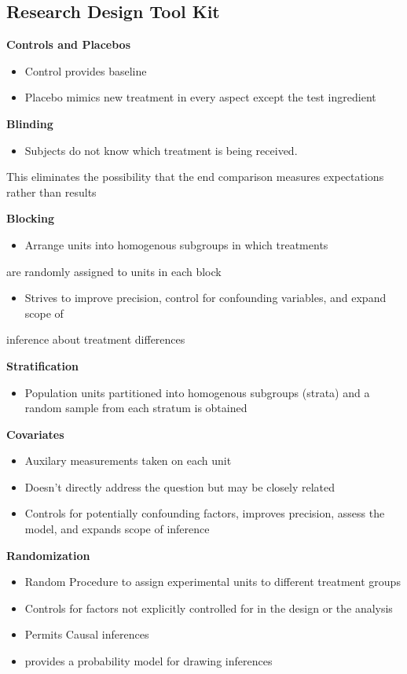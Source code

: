 \documentclass[11pt]{article}
\begin{document}
\subsection{Research Design Tool Kit}
\label{sec:org1912f44}
\textbf{Controls and Placebos}
\begin{itemize}
\item Control provides baseline
\item Placebo mimics new treatment in every aspect except the test ingredient
\end{itemize}

\textbf{Blinding}
\begin{itemize}
\item Subjects do not know which treatment is being received.
\end{itemize}
This eliminates the possibility that the end comparison measures
expectations rather than results

\textbf{Blocking}
\begin{itemize}
\item Arrange units into homogenous subgroups in which treatments
\end{itemize}
are randomly assigned to units in each block
\begin{itemize}
\item Strives to improve precision, control for confounding variables, and expand scope of
\end{itemize}
inference about treatment differences

\textbf{Stratification}
\begin{itemize}
\item Population units partitioned into homogenous subgroups (strata) and a random sample from each stratum is obtained
\end{itemize}

\textbf{Covariates}
\begin{itemize}
\item Auxilary measurements taken on each unit
\item Doesn't directly address the question but may be closely related
\item Controls for potentially confounding factors, improves precision, assess the
model, and expands scope of inference
\end{itemize}

\textbf{Randomization}
\begin{itemize}
\item Random Procedure to assign experimental units to different treatment groups
\item Controls for factors not explicitly controlled for in the design or the
analysis
\item Permits Causal inferences
\item provides a probability model for drawing inferences
\end{itemize}
\end{document}
